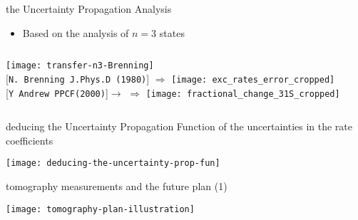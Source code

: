 \begin{CJK*}{UTF8}{kai}
\begin{frame}{the Uncertainty Propagation Analysis}
	\begin{itemize}
		\item Based on the analysis of $n=3$ states
	\end{itemize}
	\vspace{-2em}
	\begin{columns}
				\texttt{[image: transfer-n3-Brenning]}\\
				\mbox{\tiny [\texttt{N. Brenning J.Phys.D (1980)}]}
				$\Rightarrow$
				\vspace{2.5cm}
				\texttt{[image: exc\_rates\_error\_cropped]}\\
				\vspace{2.1cm}
				\mbox{{\tiny [\texttt{Y Andrew PPCF(2000)}]}$\to$}
				$\Rightarrow$
				\texttt{[image: fractional\_change\_31S\_cropped]}
	\end{columns}
	
\end{frame}


\begin{frame}{deducing the Uncertainty Propagation Function of the uncertainties in the rate coefficients}
    \vspace{-0.5em}
    \begin{center}
        \texttt{[image: deducing-the-uncertainty-prop-fun]}
    \end{center}
\end{frame}

\begin{frame}{tomography measurements and the future plan (1)}
    \vspace{-0.5em}
    \begin{center}
        \texttt{[image: tomography-plan-illustration]}
    \end{center}
\end{frame}


\end{CJK*}
